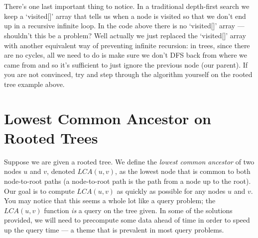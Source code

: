 \documentclass[11pt]{article}
\theoremstyle{plain}
\theoremstyle{definition}
\begin{document}
\\\\
There's one last important thing to notice. In a traditional depth-first search we keep a `visited[]' array that tells us when a node is visited so that we don't end up in a recursive infinite loop. In the code above there is no `visited[]' array --- shouldn't this be a problem? Well actually we just replaced the `visited[]' array with another equivalent way of preventing infinite recursion: in trees, since there are no cycles, all we need to do is make sure we don't DFS back from where we came from and so it's sufficient to just ignore the previous node (our parent). If you are not convinced, try and step through the algorithm yourself on the rooted tree example above.
\section{Lowest Common Ancestor on Rooted Trees}
Suppose we are given a rooted tree. We define the \emph{lowest common ancestor} of two nodes $u$ and $v$, denoted $LCA(u, v)$, as the lowest node that is common to both node-to-root paths (a node-to-root path is the path from a node up to the root). Our goal is to compute $LCA(u, v)$ as quickly as possible for any nodes $u$ and $v$. You may notice that this seems a whole lot like a query problem; the $LCA(u, v)$ function \emph{is} a query on the tree given. In some of the solutions provided, we will need to precompute some data ahead of time in order to speed up the query time --- a theme that is prevalent in most query problems.
\end{document}
